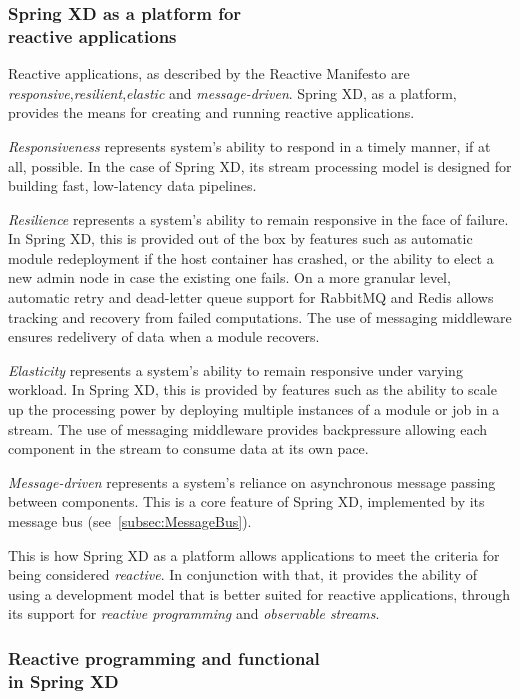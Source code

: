 \subsubsection {Spring XD as a platform for \\ reactive applications}

Reactive applications, as described by the Reactive Manifesto
\cite{reactive-manifesto} are \emph{responsive},\emph{resilient},\emph{elastic}
and \emph{message-driven}. Spring XD, as a platform, provides the means for creating and
running reactive applications.

\emph{Responsiveness} represents system's ability to respond in a timely manner, if
at all, possible. In the case of Spring XD, its stream processing model is designed
for building fast, low-latency data pipelines.

\emph{Resilience} represents a system's ability to remain responsive in the face of
failure. In Spring XD, this is provided out of the box by features such as automatic
module redeployment if the host container has crashed, or the ability to elect a new
admin node in case the existing one fails. On a more granular level, automatic retry
and dead-letter queue support for RabbitMQ and Redis allows tracking and recovery
from failed computations. The use of messaging middleware ensures redelivery of data
when a module recovers.

\emph{Elasticity} represents a system's ability to remain responsive under varying
workload. In Spring XD, this is provided by features such as the ability to scale up
the processing power by deploying multiple instances of a module or job in a stream.
The use of messaging middleware provides backpressure allowing each component in the
stream to consume data at its own pace.

\emph{Message-driven} represents a system's reliance on \linebreak
asynchronous message passing between components. This is a core
feature of Spring XD, implemented by its message bus (see~\ref{subsec:MessageBus}).

This is how Spring XD as a platform allows applications to meet the criteria for being
considered \emph{reactive}. In conjunction with that, it provides the ability of using
a development model that is better suited for reactive applications, through its support
for \emph{reactive programming} and \emph{observable streams}.

\subsubsection {Reactive programming and functional \\ in Spring XD}

